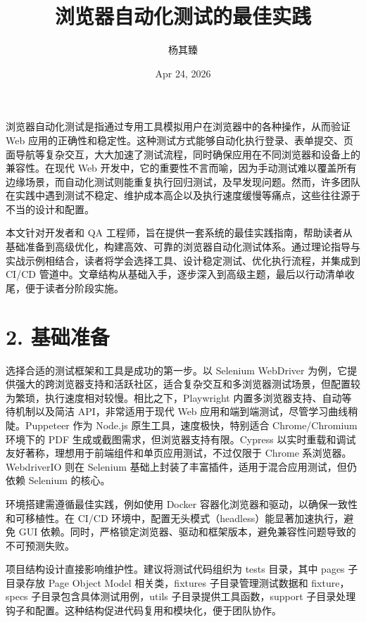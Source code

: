 \title{浏览器自动化测试的最佳实践}
\author{杨其臻}
\date{Apr 24, 2026}
\maketitle
浏览器自动化测试是指通过专用工具模拟用户在浏览器中的各种操作，从而验证 Web 应用的正确性和稳定性。这种测试方式能够自动化执行登录、表单提交、页面导航等复杂交互，大大加速了测试流程，同时确保应用在不同浏览器和设备上的兼容性。在现代 Web 开发中，它的重要性不言而喻，因为手动测试难以覆盖所有边缘场景，而自动化测试则能重复执行回归测试，及早发现问题。然而，许多团队在实践中遇到测试不稳定、维护成本高企以及执行速度缓慢等痛点，这些往往源于不当的设计和配置。\par
本文针对开发者和 QA 工程师，旨在提供一套系统的最佳实践指南，帮助读者从基础准备到高级优化，构建高效、可靠的浏览器自动化测试体系。通过理论指导与实战示例相结合，读者将学会选择工具、设计稳定测试、优化执行流程，并集成到 CI/CD 管道中。文章结构从基础入手，逐步深入到高级主题，最后以行动清单收尾，便于读者分阶段实施。\par
\chapter{2. 基础准备}
选择合适的测试框架和工具是成功的第一步。以 Selenium WebDriver 为例，它提供强大的跨浏览器支持和活跃社区，适合复杂交互和多浏览器测试场景，但配置较为繁琐，执行速度相对较慢。相比之下，Playwright 内置多浏览器支持、自动等待机制以及简洁 API，非常适用于现代 Web 应用和端到端测试，尽管学习曲线稍陡。Puppeteer 作为 Node.js 原生工具，速度极快，特别适合 Chrome/Chromium 环境下的 PDF 生成或截图需求，但浏览器支持有限。Cypress 以实时重载和调试友好著称，理想用于前端组件和单页应用测试，不过仅限于 Chrome 系浏览器。WebdriverIO 则在 Selenium 基础上封装了丰富插件，适用于混合应用测试，但仍依赖 Selenium 的核心。\par
环境搭建需遵循最佳实践，例如使用 Docker 容器化浏览器和驱动，以确保一致性和可移植性。在 CI/CD 环境中，配置无头模式（headless）能显著加速执行，避免 GUI 依赖。同时，严格锁定浏览器、驱动和框架版本，避免兼容性问题导致的不可预测失败。\par
项目结构设计直接影响维护性。建议将测试代码组织为 tests 目录，其中 pages 子目录存放 Page Object Model 相关类，fixtures 子目录管理测试数据和 fixture，specs 子目录包含具体测试用例，utils 子目录提供工具函数，support 子目录处理钩子和配置。这种结构促进代码复用和模块化，便于团队协作。\par
